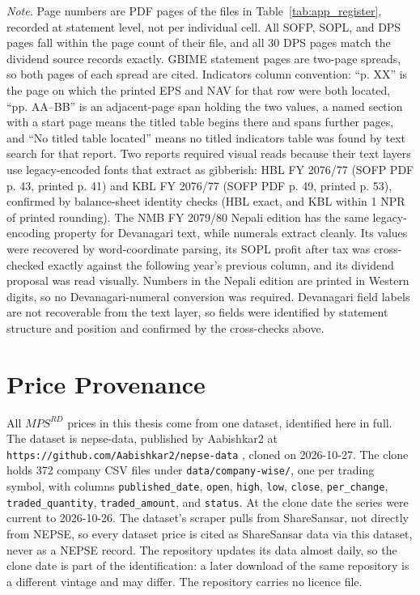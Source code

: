 \vspace{4pt}
\noindent\begin{minipage}{\linewidth}
\footnotesize
\textit{Note.} Page numbers are PDF pages of the files in Table~\ref{tab:app_register}, recorded at statement level, not per individual cell. All SOFP, SOPL, and DPS pages fall within the page count of their file, and all 30 DPS pages match the dividend source records exactly. GBIME statement pages are two-page spreads, so both pages of each spread are cited. Indicators column convention: ``p. XX'' is the page on which the printed EPS and NAV for that row were both located, ``pp. AA--BB'' is an adjacent-page span holding the two values, a named section with a start page means the titled table begins there and spans further pages, and ``No titled table located'' means no titled indicators table was found by text search for that report. Two reports required visual reads because their text layers use legacy-encoded fonts that extract as gibberish: HBL FY 2076/77 (SOFP PDF p. 43, printed p. 41) and KBL FY 2076/77 (SOFP PDF p. 49, printed p. 53), confirmed by balance-sheet identity checks (HBL exact, and KBL within 1 NPR of printed rounding). The NMB FY 2079/80 Nepali edition has the same legacy-encoding property for Devanagari text, while numerals extract cleanly. Its values were recovered by word-coordinate parsing, its SOPL profit after tax was cross-checked exactly against the following year's previous column, and its dividend proposal was read visually. Numbers in the Nepali edition are printed in Western digits, so no Devanagari-numeral conversion was required. Devanagari field labels are not recoverable from the text layer, so fields were identified by statement structure and position and confirmed by the cross-checks above.
\end{minipage}

\section{Price Provenance}

All $\mathit{MPS}^{RD}$ prices in this thesis come from one dataset, identified here in full. The dataset is nepse-data, published by Aabishkar2 at \nolinkurl{https://github.com/Aabishkar2/nepse-data} \citep{nepsedata2026}, cloned on 2026-10-27. The clone holds 372 company CSV files under \texttt{data/company-wise/}, one per trading symbol, with columns \texttt{published\_date}, \texttt{open}, \texttt{high}, \texttt{low}, \texttt{close}, \texttt{per\_change}, \texttt{traded\_quantity}, \texttt{traded\_amount}, and \texttt{status}. At the clone date the series were current to 2026-10-26. The dataset's scraper pulls from ShareSansar, not directly from NEPSE, so every dataset price is cited as ShareSansar data via this dataset, never as a NEPSE record. The repository updates its data almost daily, so the clone date is part of the identification: a later download of the same repository is a different vintage and may differ. The repository carries no licence file.

